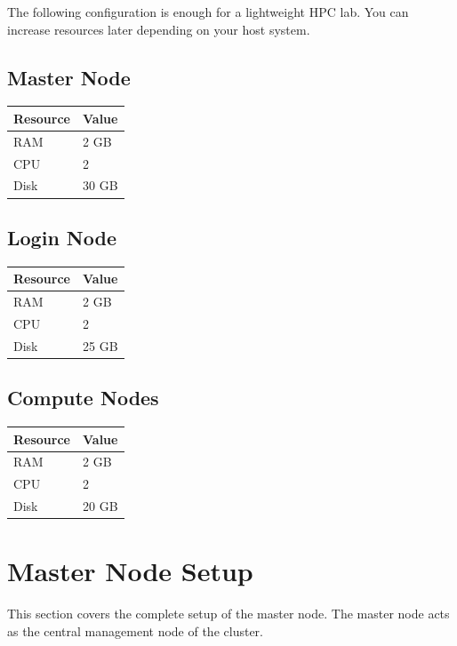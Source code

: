 \documentclass[11pt]{article}
\begin{document}
The following configuration is enough for a lightweight HPC lab.
You can increase resources later depending on your host system.
\subsection{Master Node}
\label{sec:orgb075d7e}

\begin{center}
\begin{tabular}{ll}
Resource & Value\\
\hline
RAM & 2 GB\\
CPU & 2\\
Disk & 30 GB\\
\end{tabular}
\end{center}
\subsection{Login Node}
\label{sec:org47dd378}

\begin{center}
\begin{tabular}{ll}
Resource & Value\\
\hline
RAM & 2 GB\\
CPU & 2\\
Disk & 25 GB\\
\end{tabular}
\end{center}
\subsection{Compute Nodes}
\label{sec:org8853e72}

\begin{center}
\begin{tabular}{ll}
Resource & Value\\
\hline
RAM & 2 GB\\
CPU & 2\\
Disk & 20 GB\\
\end{tabular}
\end{center}
\section{Master Node Setup}
\label{sec:org79124d4}

This section covers the complete setup of the master node. The master node
acts as the central management node of the cluster.
\end{document}
